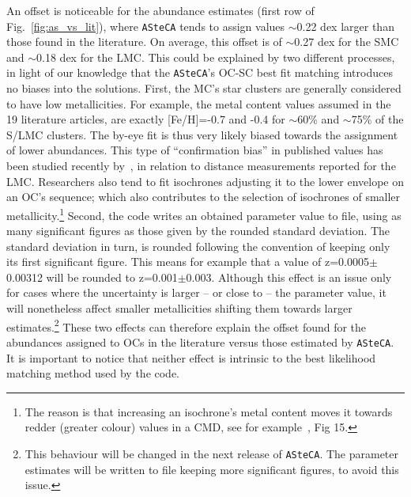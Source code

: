 \documentclass[a4paper,fleqn,usenatbib]{mnras}
\begin{document}
An offset is noticeable for the abundance estimates (first row of
Fig.~\ref{fig:as_vs_lit}), where \texttt{ASteCA} tends to assign values
$\sim$0.22 dex larger than those found in the literature.
On average, this offset is of $\sim$0.27 dex for the SMC and $\sim$0.18 dex for
the LMC.\@
%
This could be explained by two different processes, in light of our
knowledge that the \texttt{ASteCA}'s OC-SC best fit matching introduces no
biases into the solutions.
%
First, the MC's star clusters are generally considered to have low
metallicities. For example, the metal content values assumed in the 19
literature articles, are exactly [Fe/H]=-0.7 and -0.4 for $\sim$60\% and
$\sim$75\% of the S/LMC clusters. The by-eye fit is thus very likely biased
towards the assignment of lower abundances. This type of ``confirmation
bias'' in published values has been studied recently by~\cite{de_Grijs_2014}, in
relation to distance measurements reported for the LMC.\@
Researchers also tend to fit isochrones adjusting it to the lower envelope on an
OC's sequence; which also contributes to the selection of isochrones of
smaller metallicity.\footnote{The reason is that increasing an isochrone's metal
content moves it towards redder (greater colour) values in a CMD, see for
example~\cite{Bressan_2012}, Fig 15.}
%
Second, the code writes an obtained parameter value to file, using as many
significant figures as those given by the rounded standard deviation.
The standard deviation in turn, is rounded following the convention of keeping
only its first significant figure. This means for example that a value of
z=0.0005$\pm$0.00312 will be rounded to z=0.001$\pm$0.003. Although this effect
is an issue only for cases where the uncertainty is larger -- or close to -- the
parameter value, it will nonetheless affect smaller metallicities shifting
them towards larger estimates.\footnote{This behaviour will be changed in the
next release of \texttt{ASteCA}. The parameter estimates will be written to
file keeping more significant figures, to avoid this issue.}
%
These two effects can therefore explain the offset found for the abundances
assigned to OCs in the literature versus those estimated by \texttt{ASteCA}. It
is important to notice that neither effect is intrinsic to the best likelihood
matching method used by the code.
\end{document}
